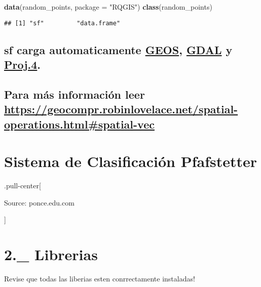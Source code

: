 \documentclass[]{article}
\newenvironment{Shaded}{\begin{snugshade}}{\end{snugshade}}
\newcommand{\KeywordTok}[1]{\textcolor[rgb]{0.13,0.29,0.53}{\textbf{#1}}}
\newcommand{\DataTypeTok}[1]{\textcolor[rgb]{0.13,0.29,0.53}{#1}}
\newcommand{\StringTok}[1]{\textcolor[rgb]{0.31,0.60,0.02}{#1}}
\newcommand{\NormalTok}[1]{#1}
\begin{document}
\begin{Shaded}
\begin{Highlighting}[]
\KeywordTok{data}\NormalTok{(random_points, }\DataTypeTok{package =} \StringTok{"RQGIS"}\NormalTok{)}
\KeywordTok{class}\NormalTok{(random_points)}
\end{Highlighting}
\end{Shaded}

\begin{verbatim}
## [1] "sf"         "data.frame"
\end{verbatim}

\subsection{\texorpdfstring{\textbf{sf} carga automaticamente
\href{https://trac.osgeo.org/geos/}{GEOS},
\href{http://www.gdal.org/}{GDAL} y
\href{https://proj4.org/}{Proj.4}.}{sf carga automaticamente GEOS, GDAL y Proj.4.}}\label{sf-carga-automaticamente-geos-gdal-y-proj.4.}

\subsection{\texorpdfstring{Para más información leer
\url{https://geocompr.robinlovelace.net/spatial-operations.html\#spatial-vec}}{Para más información leer https://geocompr.robinlovelace.net/spatial-operations.html\#spatial-vec}}\label{para-mas-informacion-leer-httpsgeocompr.robinlovelace.netspatial-operations.htmlspatial-vec}

\section{Sistema de Clasificación
Pfafstetter}\label{sistema-de-clasificacion-pfafstetter}

.pull-center{[}

Source: ponce.edu.com

{]}

\section{2.\_ Librerias}\label{librerias}

 Revise que todas las liberias esten conrrectamente instaladas!
\end{document}
